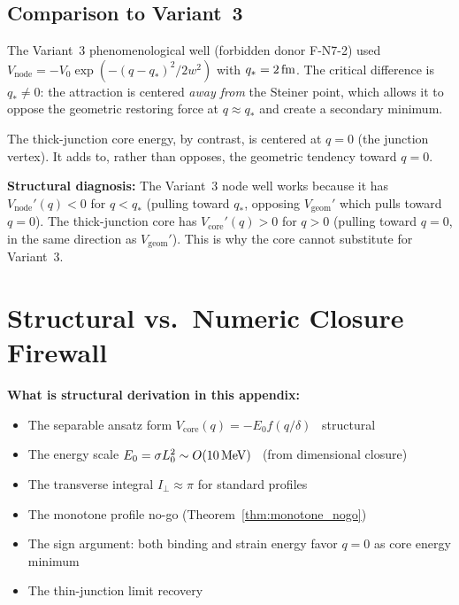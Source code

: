 \subsection{Comparison to Variant~3}

The Variant~3 phenomenological well (forbidden donor F-N7-2) used
$V_{\mathrm{node}} = -V_0 \exp(-(q-q_*)^2/2w^2)$ with $q_* = 2\,\mathrm{fm}$.
The critical difference is $q_* \neq 0$: the attraction is centered
\emph{away from} the Steiner point, which allows it to oppose the
geometric restoring force at $q \approx q_*$ and create a secondary
minimum.

The thick-junction core energy, by contrast, is centered at $q = 0$
(the junction vertex). It adds to, rather than opposes, the geometric
tendency toward $q = 0$.

\textbf{Structural diagnosis:} The Variant~3 node well works because it
has $V_{\mathrm{node}}'(q) < 0$ for $q < q_*$ (pulling toward $q_*$,
opposing $V_{\mathrm{geom}}'$ which pulls toward $q = 0$). The
thick-junction core has $V_{\mathrm{core}}'(q) > 0$ for $q > 0$
(pulling toward $q = 0$, in the same direction as $V_{\mathrm{geom}}'$).
This is why the core cannot substitute for Variant~3.

\section{Structural vs.\ Numeric Closure Firewall}
\label{sec:P2N7:firewall}

\textbf{What is structural derivation in this appendix:}
\begin{itemize}
    \item The separable ansatz form
          $V_{\mathrm{core}}(q) = -E_0 f(q/\delta)$ \tagDc\ structural
    \item The energy scale $E_0 = \sigma L_0^2 \sim O(10\,\mathrm{MeV})$
          \tagDc\ (from dimensional closure)
    \item The transverse integral $I_\perp \approx \pi$ for standard
          profiles \tagDc
    \item The monotone profile no-go
          (Theorem~\ref{thm:monotone_nogo}) \tagDc
    \item The sign argument: both binding and strain energy favor
          $q = 0$ as core energy minimum \tagDcI
    \item The thin-junction limit recovery \tagDc
\end{itemize}

